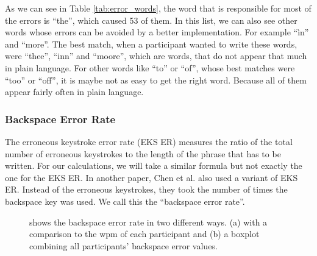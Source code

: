 As we can see in Table \ref{tab:error_words}, the word that is responsible for most of the errors is ``the'', which caused 53 of them. In this list, we can also see other words whose errors can be avoided by a better implementation. For example ``ìn'' and ``more''. The best match, when a participant wanted to write these words, were ``thee'', ``inn'' and ``moore'', which are words, that do not appear that much in plain language. For other words like ``to'' or ``of'', whose best matches were ``too'' or ``off'', it is maybe not as easy to get the right word. Because all of them appear fairly often in plain language.

\subsubsection{Backspace Error Rate}
The erroneous keystroke error rate (EKS ER) \cite{ArifTextEntry} measures the ratio of the total number of erroneous keystrokes to the length of the phrase that has to be written. For our calculations, we will take a similar formula but not exactly the one for the EKS ER. In another paper, Chen et al. \cite{10.1145/3290607.3312762} also used a variant of EKS ER. Instead of the erroneous keystrokes, they took the number of times the backspace key was used. We call this the ``backspace error rate''.
\begin{figure}[H]
    \centering
    \vspace{2em}
    \caption{shows the backspace error rate in two different ways. (a) with a comparison to the wpm of each participant and (b) a boxplot combining all participants' backspace error values.}
    \label{fig:error_backspace}
\end{figure}

